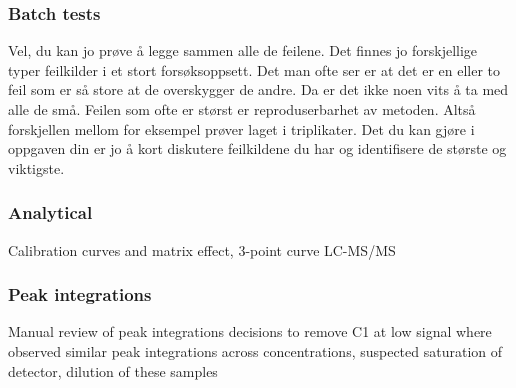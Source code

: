 \subsubsection{Batch tests}
Vel, du kan jo prøve å legge sammen alle de feilene. Det finnes jo forskjellige typer feilkilder i et stort forsøksoppsett. Det man ofte ser er at det er en eller to feil som er så store at de overskygger de andre. Da er det ikke noen vits å ta med alle de små. Feilen som ofte er størst er reproduserbarhet av metoden. Altså forskjellen mellom for eksempel prøver laget i triplikater. Det du kan gjøre i oppgaven din er jo å kort diskutere feilkildene du har og identifisere de største og viktigste.

\subsubsection{Analytical}
Calibration curves and matrix effect, 3-point curve
LC-MS/MS

\subsubsection{Peak integrations}
Manual review of peak integrations
decisions to remove C1 at low signal
where observed similar peak integrations across concentrations, suspected saturation of detector, dilution of these samples